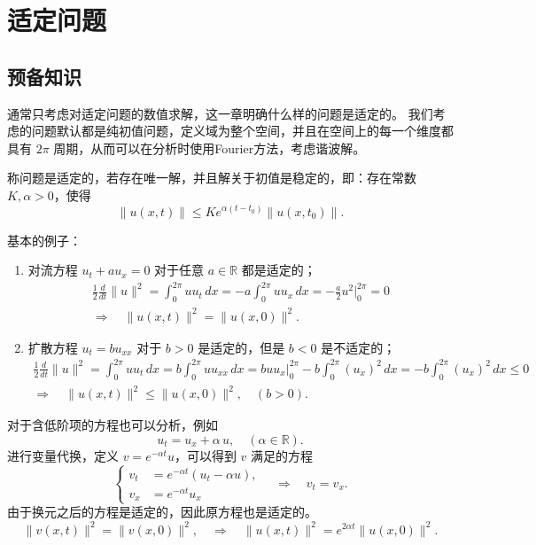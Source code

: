 \chapter{适定问题}

\section{预备知识}

通常只考虑对适定问题的数值求解，这一章明确什么样的问题是适定的。
我们考虑的问题默认都是纯初值问题，定义域为整个空间，并且在空间上的每一个维度都具有 $2\pi$ 周期，从而可以在分析时使用Fourier方法，考虑谐波解。

\begin{definition}
    称问题是适定的，若存在唯一解，并且解关于初值是稳定的，即：存在常数 $K,\alpha>0$，使得
    \[
        \| u(x,t) \| \le Ke^{\alpha(t-t_0)} \| u(x,t_0) \|.
    \]
\end{definition}

基本的例子：
\begin{enumerate}
    \item 对流方程 $u_t + a u_x = 0$ 对于任意 $a \in \mathbb{R}$ 都是适定的；
          \begin{gather*}
              \frac12 \frac{d}{dt} \| u \|^2 = \int_{0}^{2\pi} u u_t \,dx = - a \int_0^{2\pi} u u_x\,dx
              = - \frac{a}2 u^2\big|_0^{2\pi} = 0
              \\
              \Rightarrow \quad \| u(x,t) \|^2 = \| u(x,0) \|^2.
          \end{gather*}
    \item 扩散方程 $u_t = b u_{xx}$ 对于 $b > 0$ 是适定的，但是 $b < 0$ 是不适定的；
          \begin{gather*}
              \frac12 \frac{d}{dt} \| u \|^2 = \int_{0}^{2\pi} u u_t \,dx = b \int_0^{2\pi} u u_{xx}\,dx
              = b u u_x \big|_0^{2\pi} - b \int_{0}^{2\pi} (u_x)^2\,dx = - b \int_{0}^{2\pi} (u_x)^2\,dx \le 0
              \\
              \Rightarrow \quad \| u(x,t) \|^2 \le \| u(x,0) \|^2, \quad (b > 0).
          \end{gather*}
\end{enumerate}
对于含低阶项的方程也可以分析，例如
\[
    u_t = u_x + \alpha\,u, \quad (\alpha \in \mathbb{R}).
\]
进行变量代换，定义 $v = e^{-\alpha t} u$，可以得到 $v$ 满足的方程
\[
    \left\{
    \begin{aligned}
        v_t & = e^{-\alpha t} (u_t - \alpha u), \\
        v_x & = e^{-\alpha t} u_x
    \end{aligned}
    \right.
    \quad \Rightarrow \quad v_t = v_x.
\]
由于换元之后的方程是适定的，因此原方程也是适定的。
\[
    \| v(x,t) \|^2 = \| v(x,0) \|^2, \quad \Rightarrow \quad \| u(x,t) \|^2 = e^{2 \alpha t} \| u(x,0) \|^2.
\]

